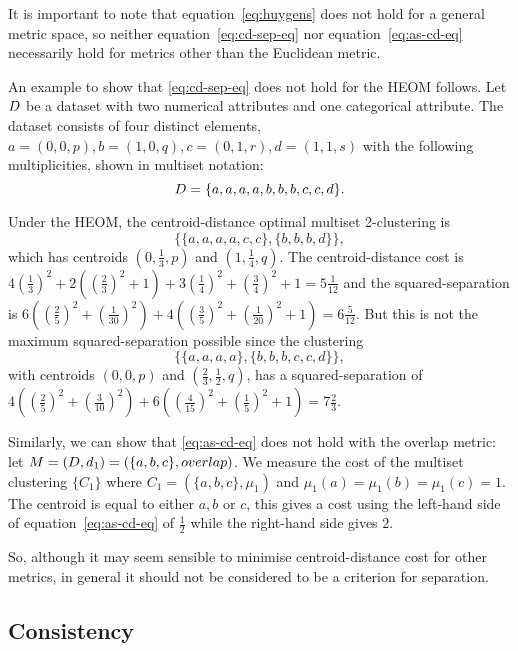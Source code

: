 It is important to note that equation~\eqref{eq:huygens} does not hold for a
general metric space, so neither equation~\eqref{eq:cd-sep-eq} nor
equation~\eqref{eq:as-cd-eq} necessarily hold for metrics other than the
Euclidean metric.

An example to show that \eqref{eq:cd-sep-eq} does not hold for the HEOM
follows.  Let $D$ be a dataset with two numerical attributes and one
categorical attribute.  The dataset consists of four distinct elements,
$a=(0,0,p), b=(1,0,q), c=(0,1,r), d=(1,1,s)$ with the following
multiplicities, shown in multiset notation:
\begin{equation*}
  D = \{a,a,a,a,b,b,b,c,c,d\}.
\end{equation*}

Under the HEOM, the centroid-distance optimal multiset 2-clustering is
\begin{equation*}
  \{\{a,a,a,a,c,c\},\{b,b,b,d\}\},
\end{equation*}
which has centroids $(0,\frac{1}{3},p)$ and $(1,\frac{1}{4},q)$.  The
centroid-distance cost is $4(\frac{1}{3})^2 + 2((\frac{2}{3})^2+1) +
3(\frac{1}{4})^2 + (\frac{3}{4})^2 + 1 = 5\frac{1}{12}$ and the
squared-separation is $6((\frac{2}{5})^2+(\frac{1}{30})^2) +
4((\frac{3}{5})^2+(\frac{1}{20})^2+1) = 6\frac{5}{12}$.  But this is not the
maximum squared-separation possible since the clustering
\begin{equation*}
  \{\{a,a,a,a\},\{b,b,b,c,c,d\}\},
\end{equation*}
with centroids $(0,0,p)$ and $(\frac{2}{3},\frac{1}{2},q)$, has a
squared-separation of $4((\frac{2}{5})^2+(\frac{3}{10})^2) +
6((\frac{4}{15})^2+(\frac{1}{5})^2+1) = 7\frac{2}{3}$.

Similarly, we can show that \eqref{eq:as-cd-eq} does not hold with the overlap
metric: let $M = (D,d_1) = (\{a,b,c\},overlap)$.  We measure the cost of
the multiset clustering $\{C_1\}$ where $C_1 = (\{a,b,c\},\mu_1)$ and
$\mu_1(a)=\mu_1(b)=\mu_1(c)=1$.  The centroid is equal to either $a,b$ or $c$,
this gives a cost using the left-hand side of equation~\eqref{eq:as-cd-eq} of
$\frac{1}{2}$ while the right-hand side gives $2$.

So, although it may seem sensible to minimise centroid-distance cost for other
metrics, in general it should not be considered to be a criterion for
separation.

\subsection{Consistency}
\label{sec:consistency}

